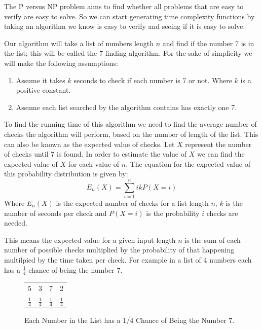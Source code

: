 \documentclass[twoside,10pt]{article}
\begin{document}
The P versus NP problem aims to find whether all problems that are easy to verify are easy to solve. So we can start generating time complexity functions by taking an algorithm we know is easy to verify and seeing if it is easy to solve.

Our algorithm will take a list of numbers length $n$ and find if the number 7 is in the list; this will be called the 7 finding algorithm. For the sake of simplicity we will make the following assumptions:
\begin{enumerate}
    \item Assume it takes $k$ seconds to check if each number is 7 or not. Where $k$ is a positive constant.
    \item Assume each list searched by the algorithm contains has exactly one 7.
\end{enumerate}

To find the running time of this algorithm we need to find the average number of checks the algorithm will perform, based on the number of length of the list. This can  also be known as the expected value of checks. Let $X$ represent the number of checks until 7 is found. In order to estimate the value of $X$ we can find the expected value of $X$ for each value of $n$. The equation for the expected value of this probability distribution is given by:
\[E_{n}(X)=\sum_{i=1}^nikP(X=i)\]
Where $E_{n}(X)$ is the expected number of checks for a list length $n$, $k$ is the number of seconds per check and $P(X=i)$ is the probability $i$ checks are needed.

This means the expected value for a given input length $n$ is the sum of each number of possible checks multiplied by the probability of that happening multilpied by the time taken per check. For example in a list of 4 numbers each has a $\frac{1}{4}$ chance of being the number 7.
\begin{figure}[h]
\centering
\begin{center}
\begin{tabular}{ c c c c }
 5 & 3 & 7 & 2\\
 $\frac{1}{4}$ & $\frac{1}{4}$ & $\frac{1}{4}$ & $\frac{1}{4}$
\end{tabular}
\end{center}
\caption{Each Number in the List has a 1/4 Chance of Being the Number 7.}
 \label{fig:fourlist}
\end{figure}
\end{document}

